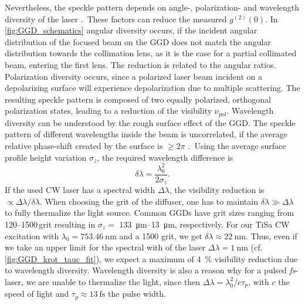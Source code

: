 Nevertheless, the speckle pattern depends on angle-, polarization- and wavelength diversity of the laser \cite{goodman_fundamental_1976}.~These factors can reduce the measured $g^{(2)}(0)$.
In \cref{fig:GGD_schematics} angular diversity occurs, if the incident angular distribution of the focused beam on the \ac{GGD} does not match the angular distribution towards the collimation lens, as it is the case for a partial collimated beam, entering the first lens. The reduction is related to the angular ratios.
Polarization diversity occurs, since a polarized laser beam incident on a depolarizing surface will experience depolarization due to multiple scattering. The resulting speckle pattern is composed of two equally polarized, orthogonal polarization states, leading to a reduction of the visibility $\nu_\mathrm{pol}$. 
Wavelength diversity can be understood by the rough surface effect of the \ac{GGD}. The speckle pattern of different wavelengths inside the beam is uncorrelated, if the average relative phase-shift created by the surface is $\geq2\pi$ \cite{goodman_fundamental_1976}.~Using the average surface profile height variation $\sigma_z$, the required wavelength difference is
\begin{equation}\label{eq:GGD_surface}
	\delta\lambda=\dfrac{\lambda_0^2}{2\sigma_z}.
\end{equation}
If the used \ac{CW} laser has a spectral width $\Delta \lambda$, the visibility reduction is $\propto\Delta\lambda/\delta\lambda$. When choosing the grit of the diffuser, one has to maintain $\delta\lambda\gg\Delta\lambda$ to fully thermalize the light source. Common \acs{GGD}s have grit sizes ranging from 120--1500\,grit resulting in $\sigma_z=$ \SIrange{133}{13}{\um}, respectively. For our TiSa \ac{CW} excitation with $\lambda_0=\SI{753.46}{\nm}$ and a 1500 grit, we get $\delta\lambda\approx \SI{22}{\nm}$. Thus, even if we take an upper limit for the spectral with of the laser $\Delta \lambda =\SI{1}{\nm}$ (cf. \cref{fig:GGD_krot_tauc_fit}), we expect a maximum of \SI{4}{\percent} visibility reduction due to wavelength diversity. Wavelength diversity is also a reason why for a pulsed \textit{fs}-laser, we are unable to thermalize the light, since then $\Delta\lambda=\lambda_0^2/c\tau_p$, with $c$ the speed of light and $ \tau_p\approx \SI{13}{\fs}$ the pulse width.\\

